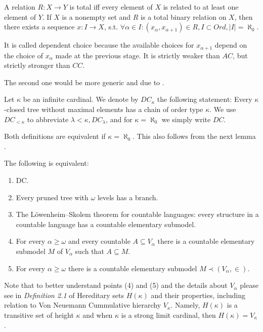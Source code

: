 \begin{definition}\label{def_dc}
  A relation $R: X \to Y$ is total iff every element of $X$ is related to at least one element of $Y$. If $X$ is a nonempty set and $R$ is a total binary relation on $X$, then there exists a sequence $x: I \to X$, s.t. $\forall \alpha \in I: (x_\alpha, x_{\alpha+1}) \in R, I \subset Ord, |I| = \aleph_0$.
\end{definition}

It is called dependent choice because the available choices for $x_{\alpha+1}$ depend on the choice of $x_\alpha$ made at the previous stage. It is strictly weaker than $AC$, but strictly stronger than $CC$. 

The second one would be more generic and due to \cite{asper2020}. 

\begin{definition}\label{def_dck}
Let $\kappa$ be an infinite cardinal. We denote by $DC_\kappa$ the following statement:
  Every $\kappa$-closed tree without maximal elements has a chain of order type $\kappa$. We use $DC_{<\kappa}$ to abbreviate $\lambda < \kappa,DC_\lambda$, and for $\kappa = \aleph_0$ we simply write $DC$.
\end{definition}

Both definitions are equivalent if $\kappa = \aleph_0$. This also follows from the next lemma \cite{asper2020,jech2003set}.
\begin{lemma}
  The following is equivalent:
  \begin{enumerate}
    \item DC.
    \item Every pruned tree with $\omega$ levels has a branch.
    \item The Löwenheim–Skolem theorem for countable languages: every structure
    in a countable language has a countable elementary submodel.
    \item For every $\alpha \geq \omega$ and every countable $A \subseteq V_\alpha$ there is a countable elementary submodel $M$ of $V_\alpha$ such that $A \subseteq M$.
    \item For every $\alpha \geq \omega$ there is a countable elementary submodel \mbox{$M \prec (V_\alpha,\in)$}.
  \end{enumerate}
\end{lemma}

Note that to better understand points (4) and (5) and the details about $V_\alpha$ please see in \cite{asper2020} \textit{Definition 2.1} of Hereditary sets $H(\kappa)$ and their properties, including relation to Von Neuemann Cummulative hierarchy $V_\kappa$. Namely, $H(\kappa)$ is a transitive set of height $\kappa$ and when $\kappa$ is a strong limit cardinal, then $H(\kappa) = V_\kappa$.

